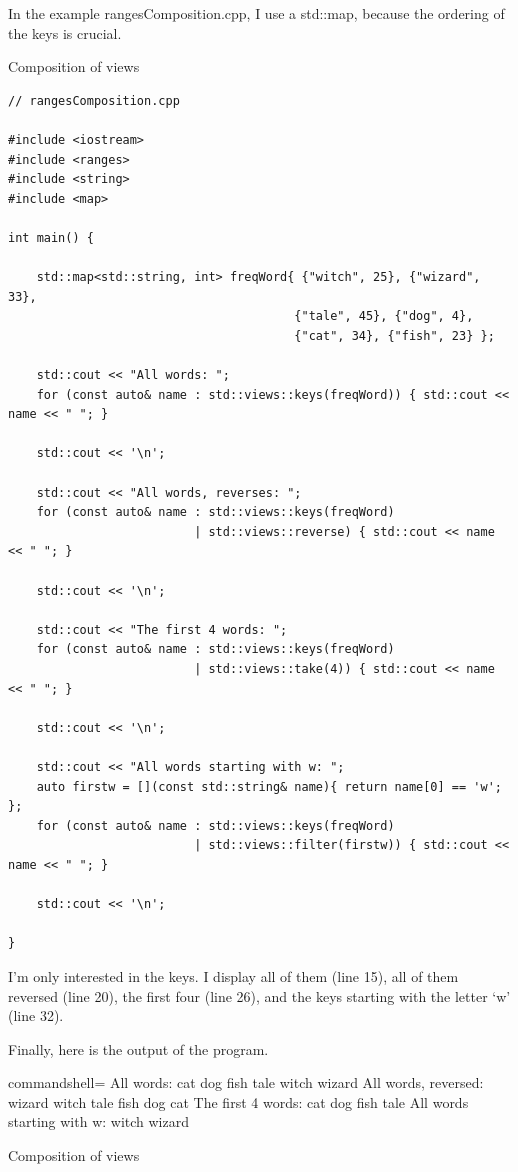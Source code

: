 In the example rangesComposition.cpp, I use a std::map, because the ordering of the keys is crucial.

\noindent
Composition of views
\begin{lstlisting}[style=styleCXX]
// rangesComposition.cpp

#include <iostream>
#include <ranges>
#include <string>
#include <map>

int main() {
	
	std::map<std::string, int> freqWord{ {"witch", 25}, {"wizard", 33},
										{"tale", 45}, {"dog", 4},
										{"cat", 34}, {"fish", 23} };
	
	std::cout << "All words: ";
	for (const auto& name : std::views::keys(freqWord)) { std::cout << name << " "; }
	
	std::cout << '\n';
	
	std::cout << "All words, reverses: ";
	for (const auto& name : std::views::keys(freqWord)
	                      | std::views::reverse) { std::cout << name << " "; }
	
	std::cout << '\n';
	
	std::cout << "The first 4 words: ";
	for (const auto& name : std::views::keys(freqWord)
	                      | std::views::take(4)) { std::cout << name << " "; }
	
	std::cout << '\n';
	
	std::cout << "All words starting with w: ";
	auto firstw = [](const std::string& name){ return name[0] == 'w'; };
	for (const auto& name : std::views::keys(freqWord)
	                      | std::views::filter(firstw)) { std::cout << name << " "; }
	
	std::cout << '\n';

}
\end{lstlisting}

I’m only interested in the keys. I display all of them (line 15), all of them reversed (line 20), the first four (line 26), and the keys starting with the letter ‘w’ (line 32).

Finally, here is the output of the program.

\begin{tcblisting}{commandshell={}}
All words: cat dog fish tale witch wizard
All words, reversed: wizard witch tale fish dog cat
The first 4 words: cat dog fish tale
All words starting with w: witch wizard
\end{tcblisting}

\begin{center}
Composition of views
\end{center}

